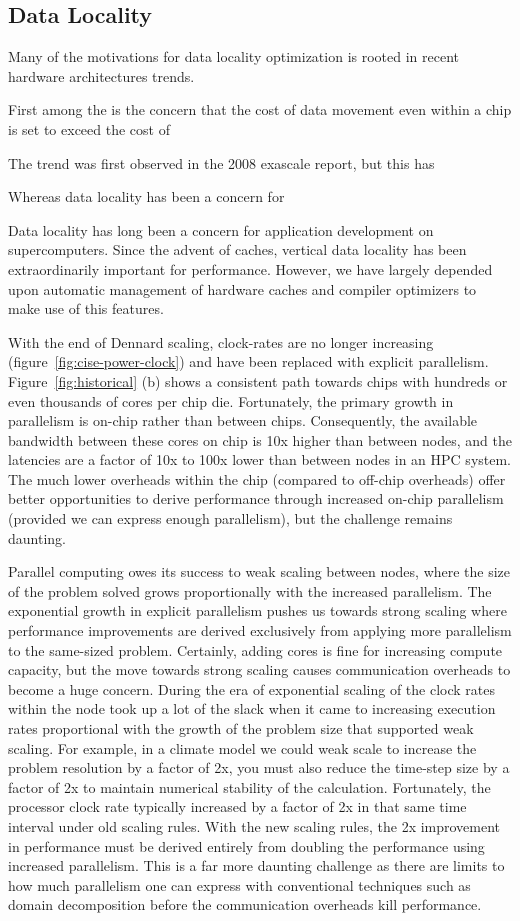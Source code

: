 \subsection{Data Locality}
Many of the motivations for data locality optimization is rooted in recent hardware architectures trends. 

First among the is the concern that the cost of data movement even within a chip is set to exceed the cost of 

The trend was first observed in the 2008 exascale report, but this has 

Whereas data locality has been a concern for 

Data locality has long been a concern for application development on supercomputers.  Since the advent of caches, vertical data locality has been extraordinarily important for performance.  However, we have largely depended upon automatic management of hardware caches and compiler optimizers to make use of this features.

With the end of Dennard scaling, clock-rates are no longer increasing (figure~\ref{fig:cise-power-clock}) and have been replaced with explicit parallelism.
Figure~\ref{fig:historical} (b) shows a consistent path towards chips with hundreds or even thousands of cores per chip die.  Fortunately, the primary growth in parallelism is on-chip rather than between chips.  Consequently, the available bandwidth between these cores on chip is 10x higher than between nodes, and the latencies are a factor of 10x to 100x lower than between nodes in an HPC system.  The much lower overheads within the chip (compared to off-chip overheads) offer better opportunities to derive performance through increased on-chip parallelism (provided we can express enough parallelism), but the challenge remains daunting.

Parallel computing owes its success to weak scaling between nodes, where the size of the problem solved grows proportionally with the increased parallelism.  The exponential growth in explicit parallelism pushes us towards strong scaling where performance improvements are derived exclusively from applying more parallelism to the same-sized problem.  Certainly, adding cores is fine for increasing compute capacity, but the move towards strong scaling causes communication overheads to become a huge concern.
During the era of exponential scaling of the clock rates within the node took up a lot of the slack when it came to increasing execution rates proportional with the growth of the problem size that supported weak scaling.  For example, in a climate model we could weak scale to increase the problem resolution by a factor of 2x, you must also reduce the time-step size by a factor of 2x to maintain numerical stability of the calculation.  Fortunately, the processor clock rate typically increased by a factor of 2x in that same time interval under old scaling rules.
With the new scaling rules, the 2x improvement in performance must be derived entirely from doubling the performance using increased parallelism.
This is a far more daunting challenge as there are limits to how much parallelism one can express with conventional techniques such as domain decomposition before the communication overheads kill performance.

